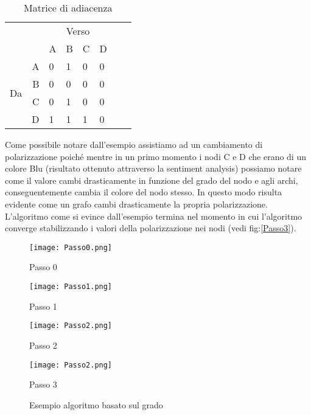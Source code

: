 \begin{table}[!htb]
\centering
\begin{tabular}{|lr|l|l|l|l|l|l|} \cline{3-6}
\multicolumn{1}{l}{} && \multicolumn{4}{c|}{Verso} \\ \cline{3-6}
\multicolumn{1}{l}{} & & A & B & C & D\\ \hline
\multirow{4}{*}{\begin{sideways}Da\end{sideways}}
& \multicolumn{1}{|r|}{A} & 0  & 1  & 0  & 0 \\ \cline{2-6}
& \multicolumn{1}{|r|}{B} & 0  & 0  & 0  & 0 \\ \cline{2-6}
& \multicolumn{1}{|r|}{C} & 0  & 1  & 0  & 0 \\ \cline{2-6}
& \multicolumn{1}{|r|}{D} & 1  & 1  & 1  & 0 \\ \hline

\end{tabular}
\caption{Matrice di adiacenza}
\label{matrice}
\end{table}
Come possibile notare dall'esempio assistiamo ad un cambiamento di polarizzazione poiché mentre in un primo momento i nodi C e D che erano di un colore Blu (risultato ottenuto attraverso la sentiment analysis) possiamo notare come il valore cambi drasticamente in funzione del grado del nodo e agli archi, conseguentemente cambia il colore del nodo stesso. In questo modo risulta evidente come un grafo cambi drasticamente la propria polarizzazione. L'algoritmo come si evince dall'esempio termina nel momento in cui l'algoritmo converge stabilizzando i valori della polarizzazione nei nodi (vedi fig:\ref{Passo3}).
\begin{figure}[htbp]
\centering
\begin{minipage}[c]{.40\textwidth}
\centering\setlength{\captionmargin}{0pt}%
\texttt{[image: Passo0.png]}
\caption{Passo 0}
\label{Passo0}
\end{minipage}%
\hspace{10mm}%
\begin{minipage}[c]{.40\textwidth}
\centering\setlength{\captionmargin}{0pt}%
\texttt{[image: Passo1.png]}
\caption{Passo 1}
\label{Passo1}
\end{minipage}
\hspace{10mm}%
\begin{minipage}[c]{.40\textwidth}
\centering\setlength{\captionmargin}{0pt}%
\texttt{[image: Passo2.png]}
\caption{Passo 2}
\label{Passo2}
\end{minipage}
\hspace{10mm}%
\begin{minipage}[c]{.40\textwidth}
\centering\setlength{\captionmargin}{0pt}%
\texttt{[image: Passo2.png]}
\caption{Passo 3}
\label{Passo3}
\end{minipage}
\caption{Esempio algoritmo basato sul grado}\label{fig:minipage2}
\end{figure}

